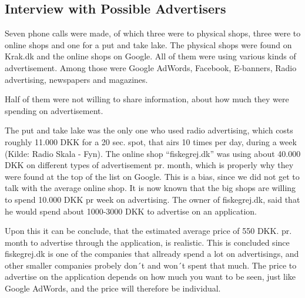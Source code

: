 \subsection{Interview with Possible Advertisers}
Seven phone calls were made, of which three were to physical shops, three were to online shops and one for a put and take lake. The physical shops were found on Krak.dk and the online shops on Google.
All of them were using various kinds of advertisement. Among those were Google AdWords, Facebook, E-banners, Radio advertising, newspapers and magazines.


Half of them were not willing to share information, about how much they were spending on advertisement.

The put and take lake was the only one who used radio advertising, which costs roughly 11.000 DKK for a 20 sec. spot, that airs 10 times per day, during a week (Kilde: Radio Skala - Fyn). The online shop “fiskegrej.dk” was using about 40.000 DKK on different types of advertisement pr. month, which is properly why they were found at the top of the list on Google. This is a bias, since we did not get to talk with the average online shop.
It is now known that the big shops are willing to spend 10.000 DKK pr week on advertising. The owner of fiskegrej.dk, said that he would spend about 1000-3000 DKK to advertise on an application.

Upon this it can be conclude, that the estimated average price of 550 DKK. pr. month to advertise through the application, is realistic. This is concluded since fiskegrej.dk is one of the companies that allready spend a lot on advertisings, and other smaller companies probely don´t and won´t spent that much.
The price to advertise on the application depends on how much you want to be seen, just like Google AdWords, and the price will therefore be individual.  
